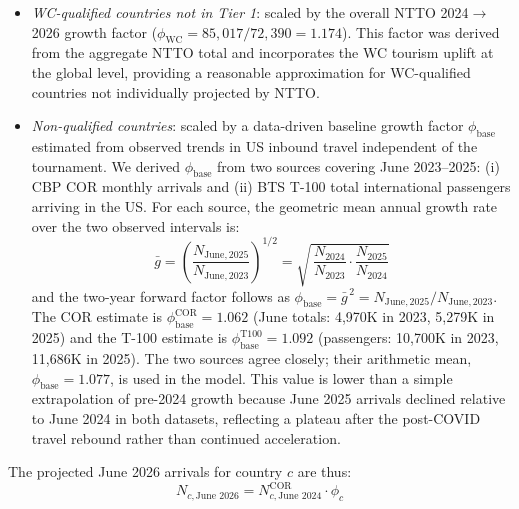 \documentclass[12pt]{article}
\begin{document}
\begin{itemize}
  \item \emph{WC-qualified countries not in Tier 1}: scaled by the
    overall NTTO 2024$\to$2026 growth factor ($\phi_{\text{WC}} =
    85{,}017/72{,}390 = 1.174$). This factor was derived from the
    aggregate NTTO total and incorporates the WC tourism uplift at
    the global level, providing a reasonable approximation for
    WC-qualified countries not individually projected by NTTO.
  \item \emph{Non-qualified countries}: scaled by a data-driven
    baseline growth factor $\phi_{\text{base}}$ estimated from
    observed trends in US inbound travel independent of the
    tournament. We derived $\phi_{\text{base}}$ from two sources
    covering June 2023--2025: (i) CBP COR monthly arrivals and (ii)
    BTS T-100 total international passengers arriving in the US.
    For each source, the geometric mean annual growth rate over the
    two observed intervals is:
    \begin{equation}
      \bar{g} = \left(\frac{N_{\text{June},2025}}{N_{\text{June},2023}}
               \right)^{1/2}
               = \sqrt{\,\frac{N_{2024}}{N_{2023}} \cdot
                              \frac{N_{2025}}{N_{2024}}}
      \label{eq:gbar}
    \end{equation}
    and the two-year forward factor follows as $\phi_{\text{base}} =
    \bar{g}^{\,2} = N_{\text{June},2025} / N_{\text{June},2023}$.
    The COR estimate is $\phi_{\text{base}}^{\text{COR}} = 1.062$
    (June totals: 4{,}970K in 2023, 5{,}279K in 2025) and the T-100
    estimate is $\phi_{\text{base}}^{\text{T100}} = 1.092$ (passengers:
    10{,}700K in 2023, 11{,}686K in 2025). The two sources agree
    closely; their arithmetic mean,
    $\phi_{\text{base}} = 1.077$, is used in the model. This value
    is lower than a simple extrapolation of pre-2024 growth because
    June 2025 arrivals declined relative to June 2024 in both
    datasets, reflecting a plateau after the post-COVID travel
    rebound rather than continued acceleration.
\end{itemize}

The projected June 2026 arrivals for country $c$ are thus:
\begin{equation}
  N_{c,\text{June 2026}} = N_{c,\text{June 2024}}^{\text{COR}}
  \cdot \phi_c
  \label{eq:travel_wc}
\end{equation}
\end{document}
